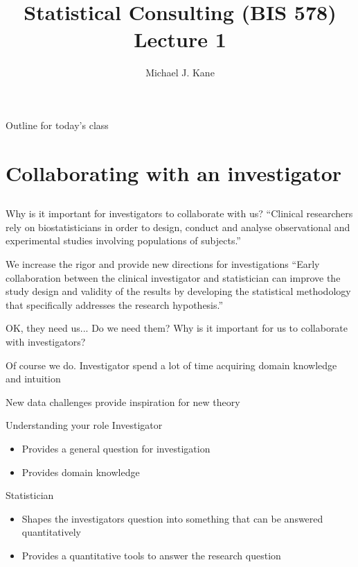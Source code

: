 \documentclass[14pt]{beamer}
\title{Statistical Consulting (BIS 578) Lecture 1}
\author{Michael J. Kane}
\date{}
\begin{document}
\begin{frame}
  \titlepage
\end{frame}

\begin{frame}{Outline for today's class}
  \tableofcontents
  \let\thefootnote\relax{}
\end{frame}

\section{Collaborating with an investigator}

\subsection*{}

\begin{frame}{Why is it important for investigators to collaborate 
with us?}
``Clinical researchers rely on biostatisticians in order to design, conduct and 
analyse observational and experimental studies involving populations of 
subjects.'' \citep{Bangdiwala2001}
\end{frame}

\begin{frame}{We increase the rigor and provide new directions
for investigations}
``Early collaboration between the clinical investigator and statistician can 
improve the study design and validity of the results by developing the 
statistical methodology that specifically addresses the research hypothesis.''
\cite{Adams2009}
\end{frame}

\begin{frame}{OK, they need us...  Do we need them?}
Why is it important for us to collaborate with investigators?
\end{frame}

\begin{frame}{Of course we do.}
Investigator spend a lot of time acquiring domain knowledge and intuition

\vspace{0.5cm}

New data challenges provide inspiration for new theory
\end{frame}

\begin{frame}{Understanding your role}
Investigator
\begin{itemize}
\item Provides a general question for investigation
\item Provides domain knowledge
\end{itemize}
Statistician
\begin{itemize}
\item Shapes the investigators question into something that can be answered
  quantitatively
\item Provides a quantitative tools to answer the research question
\end{itemize}
\end{frame}
\end{document}
